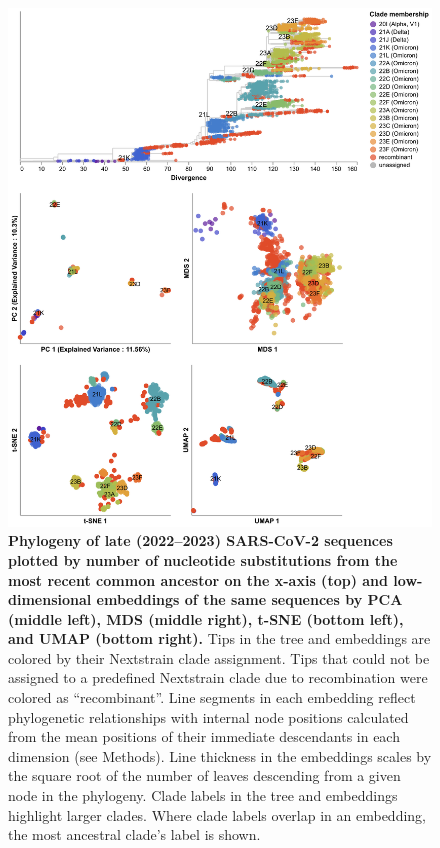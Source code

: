 \begin{figure}[!h]
\includegraphics[width=0.9\columnwidth]{figures/sarscov2-test-embeddings-by-Nextstrain_clade-clade.png}
\caption{{\bf Phylogeny of late (2022--2023) SARS-CoV-2 sequences plotted by number of nucleotide substitutions from the most recent common ancestor on the x-axis (top) and low-dimensional embeddings of the same sequences by PCA (middle left), MDS (middle right), t-SNE (bottom left), and UMAP (bottom right).}
  Tips in the tree and embeddings are colored by their Nextstrain clade assignment.
  Tips that could not be assigned to a predefined Nextstrain clade due to recombination were colored as ``recombinant''.
  Line segments in each embedding reflect phylogenetic relationships with internal node positions calculated from the mean positions of their immediate descendants in each dimension (see Methods).
  Line thickness in the embeddings scales by the square root of the number of leaves descending from a given node in the phylogeny.
  Clade labels in the tree and embeddings highlight larger clades.
  Where clade labels overlap in an embedding, the most ancestral clade's label is shown.
}
\label{S_Fig_sarscov2_late_embeddings_by_Nextstrain_clade}
\end{figure}

